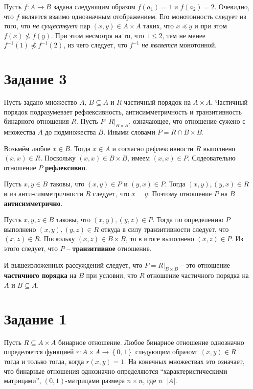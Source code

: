 \documentclass[a4paper]{article}
\newcommand{\obj}[1]{\left\{ #1 \right \}}
\newcommand{\brac}[1]{\left ( #1 \right )}
\newcommand{\induc}[1]{\left . #1 \right \vert}
\newcommand{\abs}[1]{\left | #1 \right |}
\newcommand{\defn}{\mathop{\overset{\Delta}{=}}\nolimits}
\begin{document}
Пусть $f:A\to B$ задана следующим образом $f(a_1)=1$ и $f(a_2)=2$. Очевидно, что $f$ является взаимо однозначным отображением. Его монотонность следует из того, что \emph{не существует} пар $\brac{x,y}\in A\times A$ таких, что $x\preceq y$ и при этом $f(x)\not\leq f(y)$. При этом несмотря на то, что $1\leq 2$, тем не менее $f^{-1}(1)\not\preceq f^{-1}(2)$, из чего следует, что $f^{-1}$ \emph{не является} монотонной.


\section{Задание 3} %
\label{sec:task_3}
Пусть задано множество $A$, $B\subseteq A$ и $R$ частичный порядок на $A\times A$. Частичный порядок подразумевает рефлексивность, антисимметричность и транзитивность бинарного отношения $R$. Пусть $P\defn \induc{R}_{B\times B}$, означающее, что отношение сужено с множества $A$ до подмножества $B$. Иными словами $P = R\cap B\times B$.

Возьмём любое $x\in B$. Тогда $x\in A$ и согласно рефлексивности $R$ выполнено $\brac{x,x}\in R$. Поскольку $\brac{x,x}\in B\times B$, имеем $\brac{x,x}\in P$. Слдеовательно отношение $P$ \textbf{рефлексивно}.

Пусть $x,y\in B$ таковы, что $\brac{x,y}\in P$ и $\brac{y,x}\in P$. Тогда $\brac{x,y},\brac{y,x}\in R$ и из анти-симметричности $R$ следует, что $x=y$. Поэтому отношение $P$ на $B$ \textbf{антисимметрично}.

Пусть $x,y,z\in B$ таковы, что $\brac{x,y},\brac{y,z}\in P$. Тогда по определению $P$ выполнено $\brac{x,y},\brac{y,z}\in R$ откуда в силу транзитивности следует, что $\brac{x,z}\in R$. Поскольку $\brac{x,z}\in B\times B$, то в итоге выполнено $\brac{x,z}\in P$. Из этого следует, что $P$ -- \textbf{транзитивное} отношение.

И вышеизложенных рассуждений следует, что $P=\induc{R}_{B\times B}$ -- это отношение \textbf{частичного порядка} на $B$ при условии, что $R$ отношение частичного порядка на $A$ и $B\subseteq A$.


\section{Задание 1} %
\label{sec:task_1}

Пусть $R\subseteq A\times A$ бинарное отношение. Любое бинарное отношение однозначно определяется функцией $r:A\times A\to \obj{0,1}$ следующим образом: $\brac{x,y}\in R$ тогда и только тогда, когда $r\brac{x,y}=1$. На конечных множествах это означает, что бинарные отношения однозначно определяются ``характеристическими матрицами'', $(0,1)$-матрицами размера $n\times n$, где $n\defn \abs{A}$.
\end{document}
